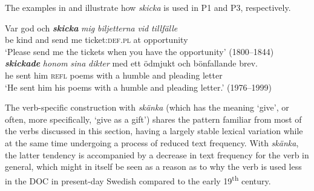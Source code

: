 \documentclass[output=paper]{langscibook}
\begin{document}
\begin{table}
\caption{Frequency measures of the verb-specific DOC with \textit{skicka} ‘send’}
\label{tab:valdeson:19}
\end{table}

The examples in  and  illustrate how \textit{skicka} is used in P1 and P3, respectively.


\ea \label{ex:valdeson:30}
\gll Var   god     och \textbf{\textit{skicka}} \textit{mig} \textit{biljetterna} \textit{vid} \textit{tillfälle}\\
  be        kind    and  send       me   ticket:\textsc{def.pl} at       opportunity\\
\glt `Please send me the tickets when you have the opportunity’ (1800–1844)
\ex \label{ex:valdeson:31}
 \textbf{\textit{skickade}} \textit{honom} \textit{sina} \textit{dikter} med     ett   ödmjukt och bönfallande   brev.\\
  he     sent         him       \textsc{refl}   poems with     a         humble   and pleading     letter\\
\glt `He sent him his poems with a humble and pleading letter.’ (1976–1999)
\z


\label{sec:valdeson:5.3.3.7}



The verb-specific construction with \textit{skänka} (which has the meaning ‘give’, or often, more specifically, ‘give as a gift’) shares the pattern familiar from most of the verbs discussed in this section, having a largely stable lexical variation while at the same time undergoing a process of reduced text frequency. With \textit{skänka}, the latter tendency is accompanied by a decrease in text frequency for the verb in general, which might in itself be seen as a reason as to why the verb is used less in the DOC in present-day Swedish compared to the early 19\textsuperscript{th} century.
\end{document}
